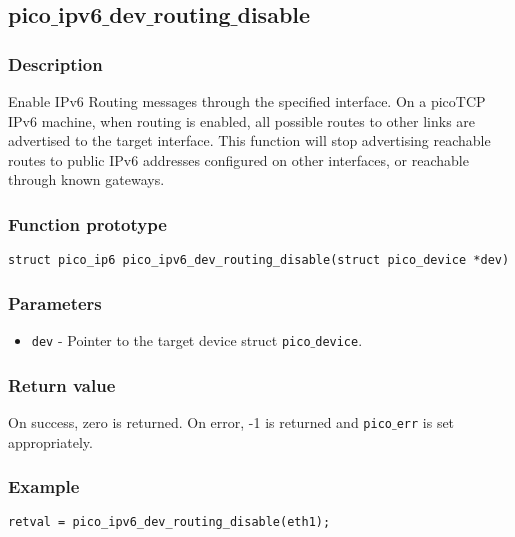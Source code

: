 \subsection{pico$\_$ipv6$\_$dev$\_$routing$\_$disable}

\subsubsection*{Description}
Enable IPv6 Routing messages through the specified interface. On a picoTCP IPv6 machine, 
when routing is enabled, all possible routes to other links are advertised to the target interface.
This function will stop advertising reachable routes to public IPv6 addresses configured on other 
interfaces, or reachable through known gateways.

\subsubsection*{Function prototype}
\begin{verbatim}
struct pico_ip6 pico_ipv6_dev_routing_disable(struct pico_device *dev)
\end{verbatim}

\subsubsection*{Parameters}
\begin{itemize}[noitemsep]
\item \texttt{dev} - Pointer to the target device struct \texttt{pico$\_$device}.
\end{itemize}

\subsubsection*{Return value}
On success, zero is returned.
On error, -1 is returned and \texttt{pico$\_$err} is set appropriately.

\subsubsection*{Example}
\begin{verbatim}
retval = pico_ipv6_dev_routing_disable(eth1);
\end{verbatim}
